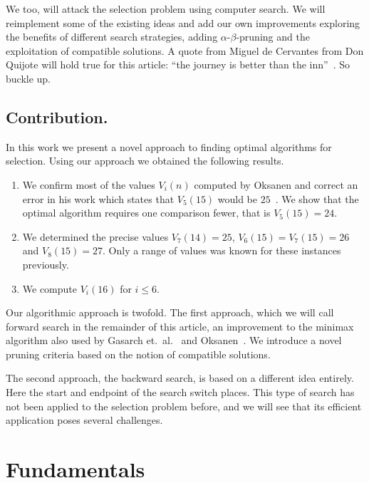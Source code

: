 \documentclass[twoside,leqno,twocolumn]{article}
\begin{document}
We too, will attack the selection problem using computer search.
We will reimplement some of the existing ideas and add our own improvements exploring the benefits of different search strategies, adding $\alpha$-$\beta$-pruning and the exploitation of compatible solutions.
A quote from Miguel de Cervantes from Don Quijote will hold true for this article: ``the journey is better than the inn''~\cite{cervantes_don_quijote}.
So buckle up.

\subsection{Contribution.}
In this work we present a novel approach to finding optimal algorithms for selection.
Using our approach we obtained the following results.
\begin{enumerate}
  \item We confirm most of the values $V_i(n)$ computed by Oksanen and correct an error in his work which states that $V_5(15)$ would be $25$~\cite{Oksanen}.
        We show that the optimal algorithm requires one comparison fewer, that is $V_5(15) = 24$.
  \item We determined the precise values $V_7(14) = 25$, $V_6(15) = V_7(15) = 26$ and $V_8(15) = 27$.
        Only a range of values was known for these instances previously.
  \item We compute $V_i(16)$ for $i \le 6$. %
\end{enumerate}

Our algorithmic approach is twofold.
The first approach, which we will call forward search in the remainder of this article, an improvement to the minimax algorithm also used by Gasarch et.\ al\@.~\cite{Gasarch1996} and Oksanen~\cite{Oksanen,Oksanen2006}.
We introduce a novel pruning criteria based on the notion of compatible solutions.

The second approach, the backward search, is based on a different idea entirely.
Here the start and endpoint of the search switch places.
This type of search has not been applied to the selection problem before, and we will see that its efficient application poses several challenges.

\section{Fundamentals}
\end{document}
